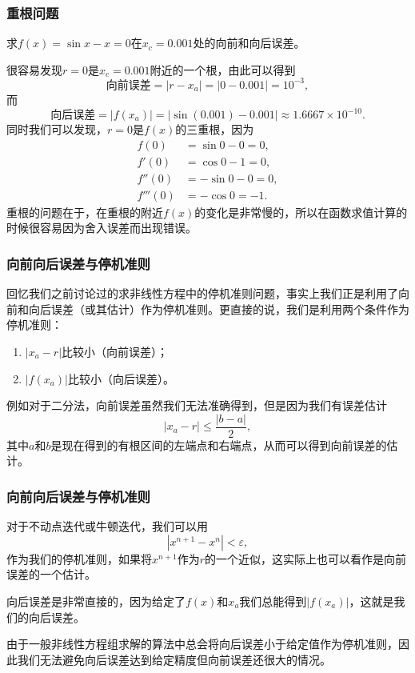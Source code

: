 \documentclass[10pt]{beamer}
\begin{document}
\begin{frame}
\frametitle{重根问题}
\begin{example}
求$f(x) = \sin x - x=0$在$x_c= 0.001$处的向前和向后误差。
\end{example}
很容易发现$r = 0$是$x_c = 0.001$附近的一个根，由此可以得到
\begin{equation}
\text{向前误差} = |r - x_a| = |0 - 0.001| = 10^{-3},
\end{equation}
而
\begin{equation}
\text{向后误差} = |f(x_a)| = |\sin (0.001)  - 0.001| \approx 1.6667 \times 10^{-10}.
\end{equation}
同时我们可以发现，$r =0$是$f(x)$的三重根，因为
\begin{align}
f(0) &= \sin 0 - 0 = 0, \nonumber \\
f'(0) &= \cos 0 - 1 = 0, \nonumber \\
f''(0) &= -\sin 0 - 0 = 0, \nonumber \\
f'''(0) &= -\cos 0  = -1. 
\end{align}
重根的问题在于，在重根的附近$f(x)$的变化是非常慢的，所以在函数求值计算的时候很容易因为舍入误差而出现错误。
\end{frame}


\begin{frame}
\frametitle{向前向后误差与停机准则}
回忆我们之前讨论过的求非线性方程中的停机准则问题，事实上我们正是利用了向前和向后误差（或其估计）作为停机准则。更直接的说，我们是利用两个条件作为停机准则：
\begin{enumerate}
\item $|x_a - r|$比较小（向前误差）；
\item $|f(x_a)|$比较小（向后误差）。
\end{enumerate}

\vspace{0.2cm}
例如对于二分法，向前误差虽然我们无法准确得到，但是因为我们有误差估计
\begin{equation}
|x_a - r| \le \frac{|b - a|}{2},
\end{equation}
其中$a$和$b$是现在得到的有根区间的左端点和右端点，从而可以得到向前误差的估计。
\end{frame}


\begin{frame}
\frametitle{向前向后误差与停机准则}
对于不动点迭代或牛顿迭代，我们可以用
\begin{equation}
|x^{n+1} - x^{n}| < \varepsilon,
\end{equation}
作为我们的停机准则，如果将$x^{n+1}$作为$r$的一个近似，这实际上也可以看作是向前误差的一个估计。

\vspace{0.2cm}
向后误差是非常直接的，因为给定了$f(x)$和$x_a$我们总能得到$|f(x_a)|$，这就是我们的向后误差。

\vspace{0.2cm}
由于一般非线性方程组求解的算法中总会将向后误差小于给定值作为停机准则，因此我们无法避免向后误差达到给定精度但向前误差还很大的情况。
\end{frame}
\end{document}
